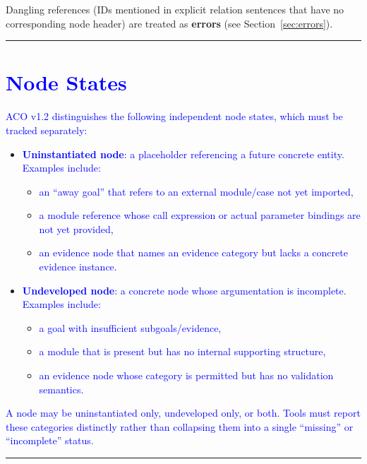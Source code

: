 \documentclass[11pt,twoside,a4paper]{article}
\begin{document}
Dangling references (IDs mentioned in explicit relation sentences that have no corresponding node header) are treated as \textbf{errors} (see Section~\ref{sec:errors}).


\bigskip
\hrule
\bigskip


\section{\textcolor{blue}{Node States}}

\textcolor{blue}{ACO v1.2 distinguishes the following independent node states, which must be tracked separately:}

\begin{itemize}[leftmargin=2em]
  \item \textcolor{blue}{\textbf{Uninstantiated node}: a placeholder referencing a future concrete entity. Examples include:}
  \begin{itemize}[leftmargin=1.5em]
    \item \textcolor{blue}{an ``away goal'' that refers to an external module/case not yet imported,}
    \item \textcolor{blue}{a module reference whose call expression or actual parameter bindings are not yet provided,}
    \item \textcolor{blue}{an evidence node that names an evidence category but lacks a concrete evidence instance.}
  \end{itemize}

  \item \textcolor{blue}{\textbf{Undeveloped node}: a concrete node whose argumentation is incomplete. Examples include:}
  \begin{itemize}[leftmargin=1.5em]
    \item \textcolor{blue}{a goal with insufficient subgoals/evidence,}
    \item \textcolor{blue}{a module that is present but has no internal supporting structure,}
    \item \textcolor{blue}{an evidence node whose category is permitted but has no validation semantics.}
  \end{itemize}
\end{itemize}

\textcolor{blue}{A node may be uninstantiated only, undeveloped only, or both. Tools must report these categories distinctly rather than collapsing them into a single ``missing'' or ``incomplete'' status.}


\bigskip
\hrule
\bigskip
\end{document}
